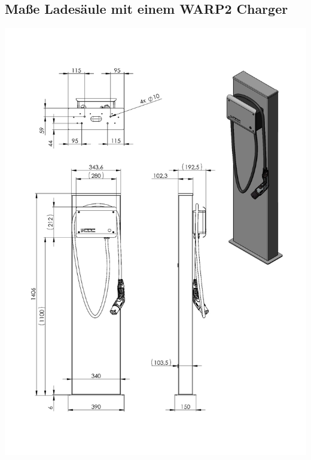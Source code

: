 \documentclass[a4paper,10pt]{article}
\begin{document}
	\subsection*{Maße Ladesäule mit einem WARP2 Charger}
	\label{appendix_stand1}
	\begin{center}
		\includegraphics[width=0.9\linewidth]{./img/stand_1}
	\end{center}
\end{document}
